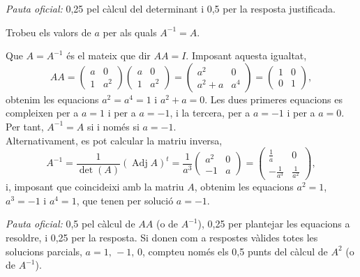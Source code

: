 \begin{apartats}
\begin{solucio}
\textit{Pauta oficial:} 0,25 pel càlcul del determinant i 0,5 per la resposta justificada.
\end{solucio}

Trobeu els valors de $a$ per als quals $A^{-1}=A$.

\begin{solucio}
Que $A=A^{-1}$ és el mateix que dir $AA=I$. Imposant aquesta igualtat,
\[
AA=\begin{pmatrix}a&0\\1&a^2\end{pmatrix}\begin{pmatrix}a&0\\1&a^2\end{pmatrix}=\begin{pmatrix}a^2&0\\a^2+a&a^4\end{pmatrix}
=\begin{pmatrix}1&0\\0&1\end{pmatrix},
\]
obtenim les equacions $a^2=a^4=1$ i $a^2+a=0$. Les dues primeres equacions es compleixen per a $a=1$ i per a
$a=-1$, i la tercera, per a $a=-1$ i per a $a=0$. Per tant, $A^{-1}=A$ si i només si $a=-1$.\\
Alternativament, es pot calcular la matriu inversa,
\[
A^{-1}=\frac{1}{\det(A)}\left(\operatorname{Adj}A\right)^t=\frac{1}{a^3}\begin{pmatrix}a^2&0\\-1&a\end{pmatrix}
=\begin{pmatrix}\frac1a&0\\-\frac1{a^3}&\frac1{a^2}\end{pmatrix},
\]
i, imposant que coincideixi amb la matriu $A$, obtenim les equacions $a^2=1$, $a^3=-1$ i $a^4=1$, que tenen per
solució $a=-1$.

\textit{Pauta oficial:} 0,5 pel càlcul de $AA$ (o de $A^{-1}$), 0,25 per plantejar les equacions a resoldre, i
0,25 per la resposta. Si donen com a respostes vàlides totes les solucions parcials, $a=1,\,-1,\,0$, compteu
només els 0,5 punts del càlcul de $A^2$ (o de $A^{-1}$).
\end{solucio}

\end{apartats}
